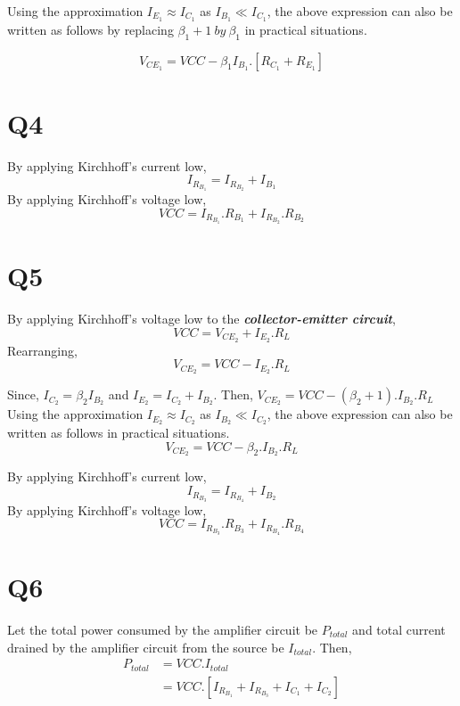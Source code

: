 \documentclass[legalpaper,11pt]{article}%
\begin{document}
Using the approximation $I_{E_1} \approx I_{C_1}$ as $I_{B_1} \ll I_{C_1}$, the above expression can also be written as follows by replacing $\beta_1 +1 ~by ~\beta_1$ in practical situations.

\[ V_{CE_1} =  VCC -\beta_1I_{B_1}.\left[R_{C_1} + R_{E_1} \right] \]


\section*{Q4}
%
By applying Kirchhoff's current low, \[I_{R_{B_1}} = I_{R_{B_2}}+I_{B_1}\]
By applying Kirchhoff's voltage low,
\[ VCC = I_{R_{B_1}}.R_{B_1} + I_{R_{B_2}}.R_{B_2} \]

\section*{Q5}
By applying Kirchhoff's voltage low to the \textbf{\textit{collector-emitter circuit}},
\[VCC = V_{CE_2} + I_{E_2}.R_L\]
Rearranging, \[ V_{CE_2} = VCC -  I_{E_2}.R_L \]

Since, $I_{C_2} = \beta_2 I_{B_2}$ and $I_{E_2} = I_{C_2} + I_{B_2}$. Then, 
$ V_{CE_2} = VCC -  \left(\beta_2+1\right).I_{B_2}.R_L $\\

Using the approximation $I_{E_2} \approx I_{C_2}$ as $I_{B_2} \ll I_{C_2}$, the above expression can also be written as follows in practical situations.
\[ V_{CE_2} = VCC -  \beta_2.I_{B_2}.R_L \]

By applying Kirchhoff's current low, \[I_{R_{B_3}} = I_{R_{B_4}}+I_{B_2}\]
By applying Kirchhoff's voltage low,
\[ VCC = I_{R_{B_3}}.R_{B_3} + I_{R_{B_4}}.R_{B_4} \]

\section*{Q6}

Let  the total power consumed by the amplifier circuit be $P_{total}$ and total current drained by the amplifier circuit from the source be $I_{total}$. Then,
\[
\begin{split}
	P_{total} &= VCC.I_{total}\\
	&= VCC. \left[  I_{R_{B_1}}+  I_{R_{B_3}}+ I_{C_1}+ I_{C_2}\right]
\end{split}
\]
\end{document}
